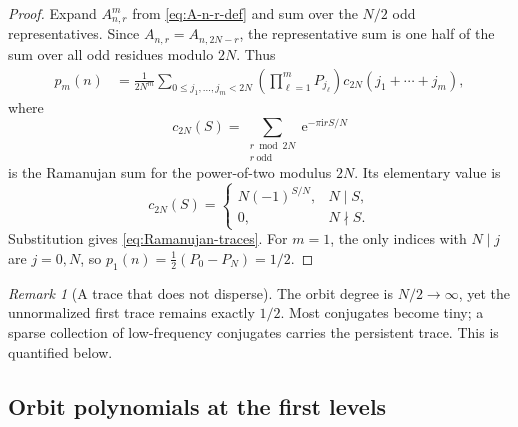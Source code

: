 \documentclass[11pt,oneside]{article}
\theoremstyle{definition}
\theoremstyle{remark}
\newtheorem{remark}[theorem]{Remark}
\newcommand{\e}{\mathrm e}
\newcommand{\ii}{\mathrm i}
\begin{document}
\begin{proof}
Expand $A_{n,r}^m$ from \eqref{eq:A-n-r-def} and sum over the $N/2$ odd
representatives.  Since $A_{n,r}=A_{n,2N-r}$, the representative sum is one
half of the sum over all odd residues modulo $2N$.  Thus
\begin{align*}
 p_m(n)
 &=\frac{1}{2N^m}
 \sum_{0\le j_1,\ldots,j_m<2N}
 \left(\prod_{\ell=1}^mP_{j_\ell}\right)
 c_{2N}(j_1+\cdots+j_m),
\end{align*}
where
\[
 c_{2N}(S)=\sum_{\substack{r\bmod 2N\\r\ \mathrm{odd}}}
 \e^{-\pi\ii rS/N}
\]
is the Ramanujan sum for the power-of-two modulus $2N$.  Its elementary value is
\begin{equation}\label{eq:Ramanujan-power-two}
 c_{2N}(S)=
 \begin{cases}
  N(-1)^{S/N},&N\mid S,\\
  0,&N\nmid S.
 \end{cases}
\end{equation}
Substitution gives \eqref{eq:Ramanujan-traces}.  For $m=1$, the only indices
with $N\mid j$ are $j=0,N$, so
$p_1(n)=\tfrac12(P_0-P_N)=1/2$.
\end{proof}

\begin{remark}[A trace that does not disperse]
The orbit degree is $N/2\to\infty$, yet the unnormalized first trace remains
exactly $1/2$.  Most conjugates become tiny; a sparse collection of low-frequency
conjugates carries the persistent trace.  This is quantified below.
\end{remark}

\subsection{Orbit polynomials at the first levels}
\end{document}
